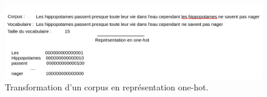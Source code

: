 \begin{figure}[h]
  \centering
  \includegraphics[width=15cm]{./Chapitre3/figures/onehot.png}
  \caption{Transformation d'un corpus en représentation one-hot.}
  \label{fig:onehot}
\end{figure}
